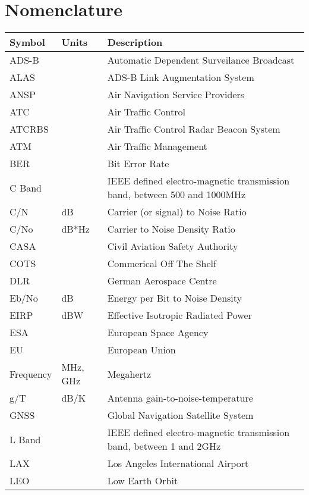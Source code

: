 \chapter*{Nomenclature}
\renewcommand*{\arraystretch}{1.0}
\begin{longtable}[l]{p{50pt} p{60pt} p{300pt}}
\textbf{Symbol}	& \textbf{Units} & \textbf{Description} \\ \endhead
    ADS-B &       & Automatic Dependent Surveilance Broadcast \\
    ALAS  &       & ADS-B Link Augmentation System \\
    ANSP  &       & Air Navigation Service Providers \\
    ATC   &       & Air Traffic Control \\
    ATCRBS &       & Air Traffic Control Radar Beacon 
System \\
    ATM   &       & Air Traffic Management \\
    BER   &       & Bit Error Rate \\
    C Band &       & IEEE defined electro-magnetic transmission band, between 500 and 1000MHz \\
    C/N   & dB    & Carrier (or signal) to Noise Ratio \\
    C/No  & dB*Hz & Carrier to Noise Density Ratio \\
    CASA  &       & Civil Aviation Safety Authority \\
    COTS  &       & Commerical Off The Shelf \\
    DLR   &       & German Aerospace Centre \\
    Eb/No & dB    & Energy per Bit to Noise Density \\
    EIRP  & dBW   & Effective Isotropic Radiated Power \\
    ESA   &       & European Space Agency \\
    EU    &       & European Union \\
    Frequency & MHz, GHz & Megahertz \\
    g/T   & dB/K  & Antenna gain-to-noise-temperature \\
    GNSS  &       & Global Navigation Satellite System \\
    L Band &       & IEEE defined electro-magnetic transmission band, between 1 and 2GHz \\
    LAX   &       & Los Angeles International Airport \\
    LEO   &       & Low Earth Orbit \\

\end{longtable}
